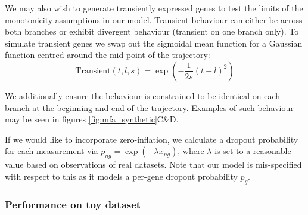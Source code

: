 We may also wish to generate transiently expressed genes to test the limits of the monotonicity assumptions in our model. Transient behaviour can either be across both branches or exhibit divergent behaviour (transient on one branch only). To simulate transient genes we swap out the sigmoidal mean function for a Gaussian function centred around the mid-point of the trajectory:
\begin{equation}
    \text{Transient}(t, l, s)  = \exp( - \frac{1}{2s} (t - l)^2 )
\end{equation}

We additionally ensure the behaviour is constrained to be identical on each branch at the beginning and end of the trajectory. Examples of such behaviour may be seen in figures \ref{fig:mfa_synthetic}C\&D.

If we would like to incorporate zero-inflation, we calculate a dropout probability for each measurement via $p_{ng} = \exp(-\lambda x_{ng})$, where $\lambda$ is set to a reasonable value based on observations of real datasets. Note that our model is mis-specified with respect to this as it models a per-gene dropout probability $p_g$.

\subsubsection{Performance on toy dataset}



